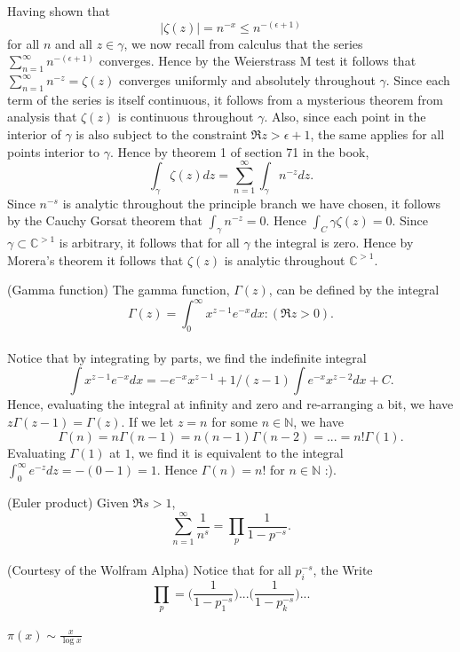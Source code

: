 \documentclass{article}
\theoremstyle{definition}
\newcommand{\C}{\mathbb{C}}
\newcommand{\N}{\mathbb{N}}
\newcommand{\defn}{\fbox{definition}}
\newcommand{\thm}{\fbox{theorem}}
\newcommand{\infsum}{\sum_{n = 1}^{\infty}}
\begin{document}
Having shown that $$|\zeta(z)|= n^{-x} \le n^{-(\epsilon + 1)}$$ for all $n$ and all $z \in \gamma$, we now recall from calculus that the series $\infsum n^{-(\epsilon + 1)}$ converges. Hence by the Weierstrass M test it follows that $\infsum n^{-z} = \zeta(z)$ converges uniformly and absolutely throughout $\gamma$. Since each term of the series is itself continuous, it follows from a mysterious theorem from analysis that $\zeta(z)$ is continuous throughout $\gamma$. Also, since each point in the interior of $\gamma$ is also subject to the constraint $\Re z > \epsilon + 1$, the same applies for all points interior to $\gamma$. Hence by theorem 1 of section 71 in the book, 
$$\int_\gamma \zeta(z)dz = \infsum \int_\gamma n^{-z}dz.$$
Since $n^{-s}$ is analytic throughout the principle branch we have chosen, it follows by the Cauchy Gorsat theorem that $\int_\gamma n^{-z} = 0$. Hence $\int_C\gamma\zeta(z) = 0$. Since $\gamma\subset \C^{>1}$ is arbitrary, it follows that for all $\gamma$ the integral is zero. Hence by Morera's theorem it follows that $\zeta(z)$ is analytic throughout $\C^{>1}.$



\newpage

\defn (Gamma function) The gamma function, $\Gamma(z)$, can be defined by the integral
$$\Gamma(z) = \int_0^\infty x^{z-1}e^{-x}dx: (\Re z > 0).$$\\


 Notice that by integrating by parts, we find the indefinite integral $$\int x^{z-1}e^{-x}dx = -e^{-x}x^{z-1} + 1/(z-1)\int e^{-x}x^{z-2}dx + C.$$
Hence, evaluating the integral at infinity and zero and re-arranging a bit, we have $z\Gamma(z-1) =\Gamma(z).$ If we let $z = n$ for some $n\in \N$, we have
$$\Gamma(n) = n\Gamma(n-1) = n(n-1)\Gamma(n-2)=...= n!\Gamma(1).$$
Evaluating $\Gamma(1)$ at $1$, we find it is equivalent to the integral $\int_0^\infty e^{-z}dz = -(0-1) = 1$. Hence $\Gamma(n) = n!$ for $n\in \N$ :). 



\newpage



\thm (Euler product)
Given $\Re s > 1$, $$\infsum \frac{1}{n^s} = \prod_p \frac{1}{1-p^{-s}}.$$\\
 (Courtesy of the Wolfram Alpha) Notice that for all $p_i^{-s}$, the  Write 
$$\prod_p = \Big(\frac{1}{1-p_1^{-s}}\Big)...\Big(\frac{1}{1-p_k^{-s}}\Big)...$$\\

$\pi(x) \sim \frac{x}{\log x}$
 
\end{document}
